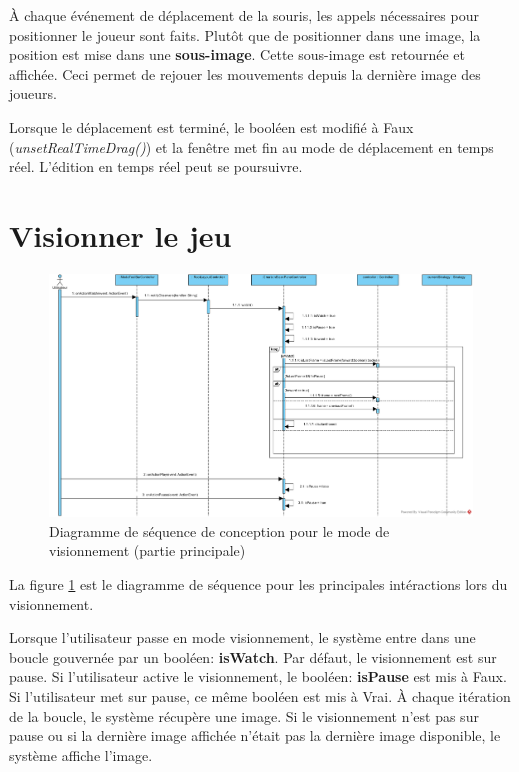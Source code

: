 À chaque événement de déplacement de la souris, les appels nécessaires pour positionner le joueur sont faits.
Plutôt que de positionner dans une image, la position est mise dans une \textbf{sous-image}.
Cette sous-image est retournée et affichée.
Ceci permet de rejouer les mouvements depuis la dernière image des joueurs.

Lorsque le déplacement est terminé, le booléen est modifié à Faux (\textit{unsetRealTimeDrag()}) et la fenêtre met fin au mode de déplacement en temps réel.
L'édition en temps réel peut se poursuivre.

\section{Visionner le jeu}
\label{sec:visionner_jeu}

\begin{figure}[htpb]
    \centering
    \includegraphics[scale=0.3]{fig/dsc_visionnement_watch.png}
    \caption{Diagramme de séquence de conception pour le mode de visionnement (partie principale)}
    \label{fig:dsc_view_main}
\end{figure}

La figure \ref{fig:dsc_view_main} est le diagramme de séquence pour les principales intéractions lors du visionnement.

Lorsque l'utilisateur passe en mode visionnement, le système entre dans une boucle gouvernée par un booléen: \textbf{isWatch}.
Par défaut, le visionnement est sur pause.
Si l'utilisateur active le visionnement, le booléen: \textbf{isPause} est mis à Faux.
Si l'utilisateur met sur pause, ce même booléen est mis à Vrai.
À chaque itération de la boucle, le système récupère une image.
Si le visionnement n'est pas sur pause ou si la dernière image affichée n'était pas la dernière image disponible, le système affiche l'image.


